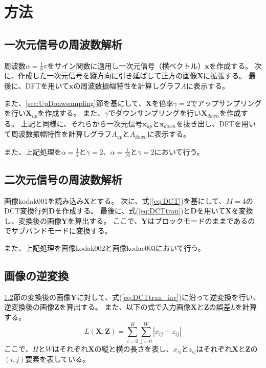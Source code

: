 \documentclass[11pt,a4paper]{jsarticle}
\begin{document}
\section{方法}
\subsection{一次元信号の周波数解析}\label{sec:1-1}
周波数$\alpha=\frac{1}{8}\pi$をサイン関数に適用し一次元信号（横ベクトル）$\bm{x}$を作成する。
次に、作成した一次元信号を縦方向に引き延ばして正方の画像$\mathbf{X}$に拡張する。
最後に、DFTを用いて$\bm{x}$の周波数振幅特性を計算しグラフ$A$に表示する。

また、\ref{sec:UpDonwsampling}節を基にして、$\mathbf{X}$を倍率$\gamma= 2$でアップサンプリングを行い$\mathbf{X}_{up}$を作成する。
また、$\gamma$でダウンサンプリングを行い$\mathbf{X}_{down}$を作成する。
上記と同様に、それらから一次元信号$\bm{x}_{up}$と$\bm{x}_{down}$を抜き出し、DFTを用いて周波数振幅特性を計算しグラフ$A_{up}$と$A_{down}$に表示する。

また、上記処理を$\alpha=\frac{1}{4}$と$\gamma=2$、$\alpha=\frac{1}{16}$と$\gamma=2$において行う。


\subsection{二次元信号の周波数解析}\label{sec:1-2}
画像kodak001を読み込み$\mathbf{X}$とする。
次に、式(\ref{eq:DCT})を基にして、$M=4$のDCT変換行列$\mathbf{D}$を作成する。
最後に、式(\ref{eq:DCTtran})と$\mathbf{D}$を用いて$\mathbf{X}$を変換し、変換後の画像$\mathbf{Y}$を算出する。
ここで、$\mathbf{Y}$はブロックモードのままであるのでサブバンドモードに変換する。

また、上記処理を画像kodak002と画像kodac003において行う。


\subsection{画像の逆変換}\label{sec:1-3}

\ref{sec:1-2}節の変換後の画像$\mathbf{Y}$に対して、式(\ref{eq:DCTtran_inv})に沿って逆変換を行い、逆変換後の画像$\mathbf{Z}$を算出する。
また、以下の式で入力画像$\mathbf{X}$と$\mathbf{Z}$の誤差$L$を計算する。
\begin{equation}
	L(\mathbf{X}, \mathbf{Z})=
	\sum_{i=0}^{H}\sum_{j=0}^{W}
	|x_{ij}-z_{ij}|
\end{equation}
ここで、$H$と$W$はそれぞれ$\mathbf X$の縦と横の長さを表し、$x_{ij}$と$z_{ij}$はそれぞれ$\mathbf{X}$と$\mathbf{Z}$の$(i,j)$要素を表している。
\end{document}
